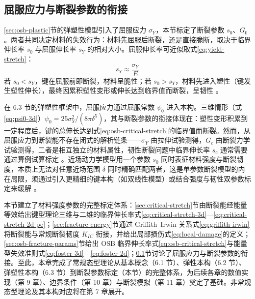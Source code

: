 \subsection{屈服应力与断裂参数的衔接}\label{sec:yield-fracture}

\ref{sec:osb-plastic}节的弹塑性模型引入了屈服应力 $\sigma_{Y}$，本节标定了断裂参数 $s_{0}$、$G_{0}$。两者共同决定材料的失效行为：材料先屈服后断裂，还是直接脆断，取决于临界伸长率 $s_{0}$ 与屈服伸长率 $s_{Y}$ 的相对大小。屈服伸长率可近似取式\eqref{eq:yield-stretch}：
\begin{equation}
  s_{Y}\approx\frac{\sigma_{Y}}{E}
  \label{eq:yield-stretch}
\end{equation}
若 $s_{0}<s_{Y}$，键在屈服前即断裂，材料呈脆性；若 $s_{0}>s_{Y}$，材料先进入塑性（键发生塑性伸长），最终因累积塑性变形或伸长达到临界值而断裂，呈韧性 \cite{Mitchell2011}。

在 6.3 节的弹塑性框架中，屈服应力通过屈服常数 $\psi_{0}$ 进入本构。三维情形（式\eqref{eq:psi0-3d}）$\psi_{0}=25\sigma_{Y}^{2}/(8\pi\delta^{5})$，其与断裂参数的衔接体现在：塑性变形积累到一定程度后，键的总伸长达到式\eqref{eq:osb-critical-stretch}的临界值而断裂。然而，从屈服应力到断裂能不存在闭式的解析链条——$\sigma_{Y}$ 由拉伸试验测得，$G_{c}$ 由断裂力学试验测得，二者是相互独立的材料属性，韧性断裂问题中临界伸长率 $s_{c}$ 通常需要通过算例试算标定 \cite{EWF2023}。近场动力学模型用一个参数 $s_{0}$ 同时表征材料强度与断裂韧度，本质上无法对任意近场范围 $\delta$ 同时精确匹配两者，这是单参数断裂模型的内在局限，须通过引入更精细的键本构（如双线性模型）或结合强度与韧性双参数标定来缓解 \cite{EWF2023,Gerstle2007}。

本节建立了材料强度参数的完整标定体系：\ref{sec:critical-stretch}节由断裂能经能量等效给出键型理论三维与二维的临界伸长率式\eqref{eq:critical-stretch-3d}—\eqref{eq:critical-stretch-2d-pe}；\ref{sec:fracture-energy}节通过 Griffith–Irwin 关系式\eqref{eq:griffith-irwin}将断裂能与常规断裂韧度 $K_{IC}$ 衔接，并给出局部损伤式\eqref{eq:local-damage}的定义；\ref{sec:osb-fracture-params}节给出 OSB 临界伸长率式\eqref{eq:osb-critical-stretch}与能量型失效准则式\eqref{eq:foster-3d}—\eqref{eq:foster-2d}；\ref{sec:yield-fracture}节讨论了屈服应力与断裂参数的衔接。至此，本章完成了常规态型理论从基本概念（6.1 节）、弹性本构（6.2 节）、弹塑性本构（6.3 节）到断裂参数标定（本节）的完整体系，为后续各章的数值实现（第 9 章）、边界条件（第 10 章）与断裂模拟（第 11 章）奠定了基础。非常规态型理论及其本构对应将在第 7 章展开。

